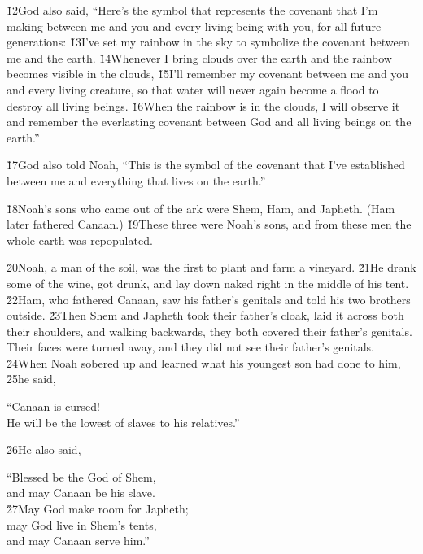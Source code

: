 \v{12}God also said, ``Here's the symbol that represents the covenant that I'm making between me and you and every living being with you, for all future generations: \v{13}I've set my rainbow in the sky to symbolize the covenant between me and the earth. \v{14}Whenever I bring clouds over the earth and the rainbow becomes visible in the clouds, \v{15}I'll remember my covenant between me and you and every living creature, so that water will never again become a flood to destroy all living beings. \v{16}When the rainbow is in the clouds, I will observe it and remember the everlasting covenant between God and all living beings on the earth.''

\v{17}God also told Noah, ``This is the symbol of the covenant that I've established between me and everything that lives on the earth.''

\v{18}Noah's sons who came out of the ark were Shem, Ham, and Japheth. (Ham later fathered Canaan.) \v{19}These three were Noah's sons, and from these men the whole earth was repopulated.

\v{20}Noah, a man of the soil, was the first to plant and farm a vineyard. \v{21}He drank some of the wine, got drunk, and lay down naked right in the middle of his tent. \v{22}Ham, who fathered Canaan, saw his father's genitals and told his two brothers outside. \v{23}Then Shem and Japheth took their father's cloak, laid it across both their shoulders, and walking backwards, they both covered their father's genitals. Their faces were turned away, and they did not see their father's genitals. \v{24}When Noah sobered up and learned what his youngest son had done to him, \v{25}he said,

\begin{poetry}
\poeml ``Canaan is cursed! \\
\poemll    He will be the lowest of slaves to his relatives.''
\end{poetry}

\v{26}He also said,

\begin{poetry}
\poeml ``Blessed be the  God of Shem, \\
\poemll    and may Canaan be his slave. \\
\poeml \v{27}May God make room for Japheth; \\
\poemll    may God live in Shem's tents, \\
\poemlll       and may Canaan serve him.''
\end{poetry}

